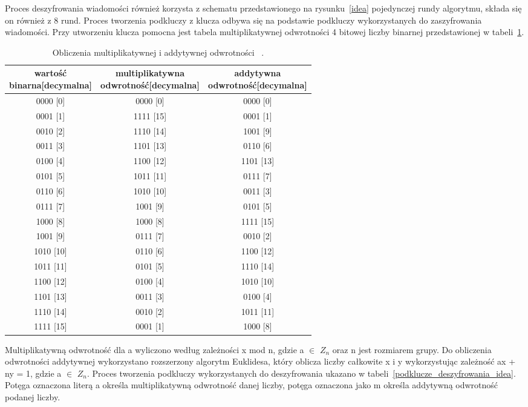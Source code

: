 \documentclass[12p]{article}
\begin{document}
Proces deszyfrowania wiadomości również korzysta z schematu przedstawionego na rysunku~\ref{idea} pojedynczej rundy algorytmu, składa się on również z 8 rund. Proces tworzenia podkluczy z klucza odbywa się na podstawie podkluczy wykorzystanych do zaszyfrowania wiadomości. Przy utworzeniu klucza pomocna jest tabela multiplikatywnej odwrotności 4 bitowej liczby binarnej przedstawionej w tabeli~\ref{nibel}.

\begin{table}[H]
\centering
\begin{tabular}{|c|c|c|}
\hline
\thead{wartość \\ binarna[decymalna]} & \thead{multiplikatywna \\  odwrotność[decymalna]} & \thead{addytywna \\ odwrotność[decymalna]}\\ \hline
0000 [0]&0000 [0]&0000 [0] \\ \hline
 0001 [1]&1111 [15]&0001 [1]\\ \hline
 0010 [2]&1110 [14]&1001 [9]\\ \hline
 0011 [3]&1101 [13]&0110 [6]\\ \hline
 0100 [4]&1100 [12]&1101 [13]\\ \hline
 0101 [5]&1011 [11]&0111 [7]\\ \hline
 0110 [6]&1010 [10]&0011 [3]\\ \hline
 0111 [7]&1001 [9]&0101 [5]\\ \hline
 1000 [8]&1000 [8]&1111 [15]\\ \hline
 1001 [9]&0111 [7]&0010 [2]\\ \hline
 1010 [10]&0110 [6]&1100 [12]\\ \hline
 1011 [11]&0101 [5]&1110 [14]\\ \hline
 1100 [12]&0100 [4]&1010 [10]\\ \hline
 1101 [13]&0011 [3]&0100 [4]\\ \hline
 1110 [14]&0010 [2]&1011 [11]\\ \hline
 1111 [15]&0001 [1]&1000 [8]\\ \hline
 \end{tabular}
\caption{Obliczenia multiplikatywnej i addytywnej odwrotności ~\cite{IDEAA}.}\label{nibel}
\end{table}

Multiplikatywną odwrotność dla a wyliczono według zależności x mod n, gdzie a $\in$ $Z_{n}$ oraz n jest rozmiarem grupy. Do obliczenia odwrotności addytywnej wykorzystano rozszerzony algorytm Euklidesa, który oblicza liczby całkowite x i y wykorzystując zależność ax + ny = 1, gdzie a $\in$ $Z_{n}$. Proces tworzenia podkluczy wykorzystanych do deszyfrowania ukazano w tabeli~\ref{podklucze_deszyfrowania_idea}. Potęga oznaczona literą a określa multiplikatywną odwrotność danej liczby, potęga oznaczona jako m określa addytywną odwrotność podanej liczby.
\end{document}
